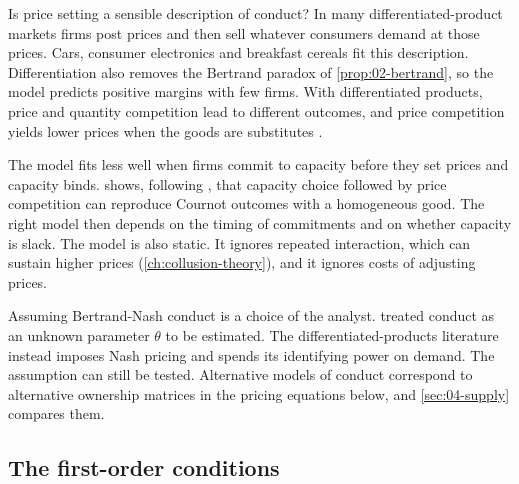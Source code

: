 Is price setting a sensible description of conduct? In many differentiated-product markets firms post prices and
then sell whatever consumers demand at those prices. Cars, consumer electronics and breakfast cereals fit this
description. Differentiation also removes the Bertrand paradox of \cref{prop:02-bertrand}, so the model
predicts positive margins with few firms. With differentiated products, price and quantity competition lead to
different outcomes, and price competition yields lower prices when the goods are substitutes
\citep{SinghVives1984}.

The model fits less well when firms commit to capacity before they set prices and capacity binds.
 shows, following \citet{KrepsScheinkman1983}, that capacity choice followed by price
competition can reproduce Cournot outcomes with a homogeneous good. The right model then depends on the timing of
commitments and on whether capacity is slack. The model is also static. It ignores repeated interaction, which
can sustain higher prices (\cref{ch:collusion-theory}), and it ignores costs of adjusting prices.

Assuming Bertrand-Nash conduct is a choice of the analyst.  treated conduct as an unknown
parameter $\theta$ to be estimated. The differentiated-products literature instead imposes Nash pricing and
spends its identifying power on demand. The assumption can still be tested. Alternative models of conduct
correspond to alternative ownership matrices in the pricing equations below, and \cref{sec:04-supply} compares
them.

\subsection{The first-order conditions}\label{sec:04-bertrand-foc}

